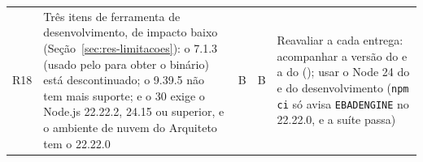 \begin{longtable}{@{}L{1.0cm}L{5.0cm}L{0.7cm}L{0.7cm}L{6.9cm}@{}}
R18 & Três itens de ferramenta de desenvolvimento, de impacto baixo (Seção~\ref{sec:res-limitacoes}): o  7.1.3 (usado pelo  para obter o binário) está descontinuado; o  9.39.5 não tem mais suporte; e o  30 exige o Node.js 22.22.2, 24.15 ou superior, e o ambiente de nuvem do Arquiteto tem o 22.22.0 & B & B & Reavaliar a cada entrega: acompanhar a versão do  e a do  (); usar o Node 24 do  e do desenvolvimento (\texttt{npm ci} só avisa \texttt{EBADENGINE} no 22.22.0, e a suíte passa)\\
\end{longtable}
